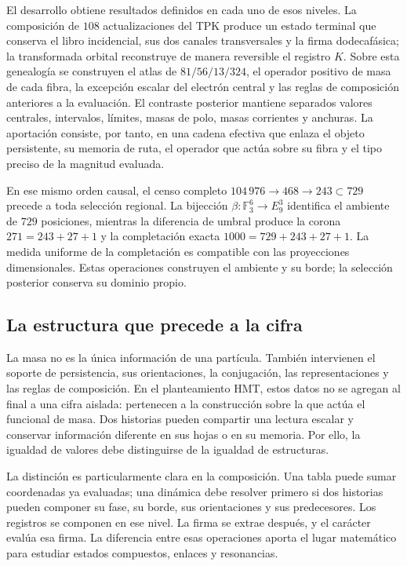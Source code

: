 El desarrollo obtiene resultados definidos en cada uno de esos niveles. La
composición de \(108\) actualizaciones del TPK produce un estado terminal
que conserva el libro incidencial, sus dos canales transversales y la firma
dodecafásica; la transformada orbital reconstruye de manera reversible el registro
\(K\). Sobre esta genealogía se construyen el atlas de
\(81/56/13/324\), el operador positivo de masa de cada fibra, la excepción
escalar del electrón central y las reglas de composición anteriores a la
evaluación. El contraste posterior mantiene separados valores centrales,
intervalos, límites, masas de polo, masas corrientes y anchuras. La aportación
consiste, por tanto, en una cadena efectiva que enlaza el objeto persistente,
su memoria de ruta, el operador que actúa sobre su fibra y el tipo preciso de
la magnitud evaluada.

En ese mismo orden causal, el censo completo
\(104\,976\to468\to243\subset729\) precede a toda selección regional. La
bijección \(\beta:\mathbb F_3^6\to E_9^3\) identifica el ambiente de
\(729\) posiciones, mientras la diferencia de umbral produce la corona
\(271=243+27+1\) y la completación exacta
\(1000=729+243+27+1\). La medida uniforme de la completación es compatible
con las proyecciones dimensionales. Estas operaciones construyen el ambiente
y su borde; la selección posterior conserva su dominio propio.

\subsection{La estructura que precede a la cifra}

La masa no es la única información de una partícula. También intervienen
el soporte de persistencia, sus orientaciones, la conjugación, las
representaciones y las reglas de composición. En el planteamiento HMT,
estos datos no se agregan al final a una cifra aislada: pertenecen a la
construcción sobre la que actúa el funcional de masa. Dos historias pueden
compartir una lectura escalar y conservar información diferente en sus
hojas o en su memoria. Por ello, la igualdad de valores debe distinguirse
de la igualdad de estructuras.

La distinción es particularmente clara en la composición. Una tabla puede
sumar coordenadas ya evaluadas; una dinámica debe resolver primero si dos
historias pueden componer su fase, su borde, sus orientaciones y sus
predecesores. Los registros se componen en ese nivel. La firma se extrae
después, y el carácter evalúa esa firma. La diferencia entre esas
operaciones aporta el lugar matemático para estudiar estados compuestos,
enlaces y resonancias.

